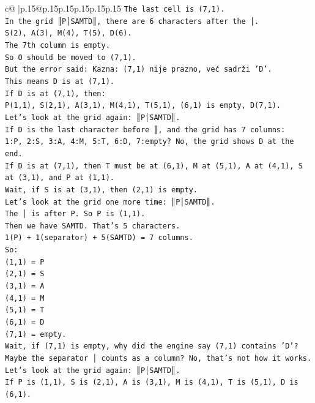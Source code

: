 \documentclass{article}
\begin{document}
{\begin{supertabular}{c@{$\;$}|p{.15\linewidth}@{}p{.15\linewidth}p{.15\linewidth}p{.15\linewidth}p{.15\linewidth}p{.15\linewidth}}
{{{\texttt{The last cell is (7,1).} \\
\texttt{In the grid ║P│SAMTD║, there are 6 characters after the │.} \\
\texttt{S(2), A(3), M(4), T(5), D(6).} \\
\texttt{The 7th column is empty.} \\
\texttt{So O should be moved to (7,1).} \\
\texttt{But the error said: Kazna: (7,1) nije prazno, već sadrži 'D'.} \\
\texttt{This means D is at (7,1).} \\
\texttt{If D is at (7,1), then:} \\
\texttt{P(1,1), S(2,1), A(3,1), M(4,1), T(5,1), (6,1) is empty, D(7,1).} \\
\texttt{Let's look at the grid again: ║P│SAMTD║.} \\
\texttt{If D is the last character before ║, and the grid has 7 columns:} \\
\texttt{1:P, 2:S, 3:A, 4:M, 5:T, 6:D, 7:empty? No, the grid shows D at the end.} \\
\texttt{If D is at (7,1), then T must be at (6,1), M at (5,1), A at (4,1), S at (3,1), and P at (1,1).} \\
\texttt{Wait, if S is at (3,1), then (2,1) is empty.} \\
\texttt{Let's look at the grid one more time: ║P│SAMTD║.} \\
\texttt{The │ is after P. So P is (1,1).} \\
\texttt{Then we have SAMTD. That's 5 characters.} \\
\texttt{1(P) + 1(separator) + 5(SAMTD) = 7 columns.} \\
\texttt{So:} \\
\texttt{(1,1) = P} \\
\texttt{(2,1) = S} \\
\texttt{(3,1) = A} \\
\texttt{(4,1) = M} \\
\texttt{(5,1) = T} \\
\texttt{(6,1) = D} \\
\texttt{(7,1) = empty.} \\
\texttt{Wait, if (7,1) is empty, why did the engine say (7,1) contains 'D'?} \\
\texttt{Maybe the separator │ counts as a column? No, that's not how it works.} \\
\texttt{Let's look at the grid again: ║P│SAMTD║.} \\
\texttt{If P is (1,1), S is (2,1), A is (3,1), M is (4,1), T is (5,1), D is (6,1).} \\
}}}
\end{supertabular}}
\end{document}
